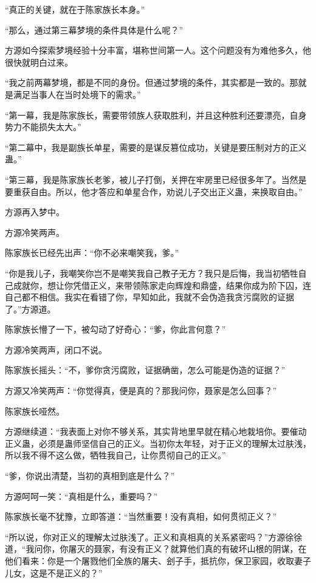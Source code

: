 \begin{this_body}
“真正的关键，就在于陈家族长本身。”

“那么，通过第三幕梦境的条件具体是什么呢？”

方源如今探索梦境经验十分丰富，堪称世间第一人。这个问题没有为难他多久，他很快就明白过来。

“我之前两幕梦境，都是不同的身份。但通过梦境的条件，其实都是一致的。那就是满足当事人在当时处境下的需求。”

“第一幕，我是陈家族长，需要带领族人获取胜利，并且这种胜利还要漂亮，自身势力不能损失太大。”

“第二幕中，我是副族长单星，需要的是谋反篡位成功，关键是要压制对方的正义蛊。”

“第三幕，我是陈家族长老爹，被儿子打倒，关押在牢房里已经很多年了。当然是要重获自由。所以，他才答应和单星合作，劝说儿子交出正义蛊，来换取自由。”

方源再入梦中。

方源冷笑两声。

陈家族长已经先出声：“你不必来嘲笑我，爹。”

“你是我儿子，我嘲笑你岂不是嘲笑我自己教子无方？我只是后悔，我当初牺牲自己成就你，想让你凭借正义，来带领陈家走向辉煌和鼎盛，结果你成为阶下囚，连自己都不相信。我实在看错了你，早知如此，我就不会伪造我贪污腐败的证据了。”方源道。

陈家族长懵了一下，被勾动了好奇心：“爹，你此言何意？”

方源冷笑两声，闭口不说。

陈家族长摇头：“不，爹你贪污腐败，证据确凿，怎么可能是伪造的证据？”

方源又冷笑两声：“你觉得真，便是真的？那我问你，聂家是怎么回事？”

陈家族长哑然。

方源继续道：“我表面上对你不够关系，其实背地里早就在精心地栽培你。要催动正义蛊，必须是蛊师坚信自己的正义。当初你太年轻，对于正义的理解太过肤浅，所以我不得不这么做，牺牲我自己，让你贯彻自己的正义。”

“爹，你说出清楚，当初的真相到底是什么？”

方源呵呵一笑：“真相是什么，重要吗？”

陈家族长毫不犹豫，立即答道：“当然重要！没有真相，如何贯彻正义？”

“所以说，你对正义的理解太过肤浅了。正义和真相真的关系紧密吗？”方源徐徐道，“我问你，你屠灭的聂家，有没有正义？就算他们真的有破坏山根的阴谋，在他们看来：你是一个屠戮他们全族的屠夫、刽子手，抵抗你，保卫家园，收取妻子儿女，这是不是正义的？”


\end{this_body}
